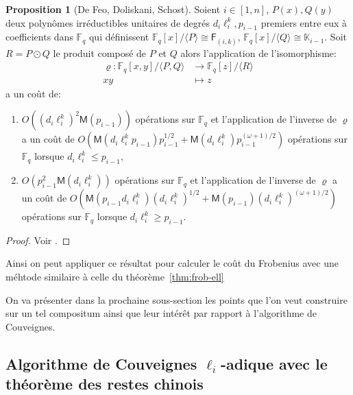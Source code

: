 \documentclass[10pt,a4paper]{book}
\theoremstyle{plain}
\theoremstyle{definition}
\theoremstyle{definition}
\theoremstyle{definition}
\newtheorem{prop}[thm]{Proposition}
\theoremstyle{definition}
\theoremstyle{remark}
\theoremstyle{remark}
\theoremstyle{definition}
\begin{document}
\begin{prop}[De Feo, Doliskani, Schost]
\label{pro:iso:fie}
Soient $i \in [1,n]$, $P(x),Q(y)$ deux polynômes irréductibles unitaires de degrés 
$d_i\ell_i^{k},p_{i-1}$ premiers entre eux à coefficients dans $\mathbb{F}_q$
qui définissent $\mathbb{F}_q[x]/\langle P \rangle \cong \mathsf{F}_{(i,k)}$,
$\mathbb{F}_q[x]/\langle Q \rangle \cong \mathbb{K}_{i-1}$. Soit $R=P \odot 
Q$ le produit composé de $P$ et $Q$ alors l'application de l'isomorphisme:
\begin{equation*}
\begin{alignedat}{1}
\varrho : \mathbb{F}_q[x,y]/\langle P, Q \rangle & \rightarrow \mathbb{F}_q[z]/\langle R \rangle \\
xy & \mapsto z
\end{alignedat}
\end{equation*}
a un coût de:
\begin{enumerate}
\item $O((d_i\ell_i^{k})^2\mathsf{M}(p_{i-1}))$ opérations sur $\mathbb{F}_q$
 et l'application de l'inverse de $\varrho$ a un coût de 
 $O(\mathsf{M}(d_i\ell_i^{k}p_{i-1})p_{i-1}^{1/2}+\mathsf{M}(d_i\ell_i^{k})p_{i-1}^{(\omega+1)/2})$ 
opérations sur $\mathbb{F}_q$ lorsque 
$d_i\ell_i^{k} \leqslant p_{i-1}$,
\item $O(p_{i-1}^2\mathsf{M}(d_i\ell_i^{k}))$ opérations sur $\mathbb{F}_q$ 
et l'application de l'inverse de $\varrho$ a un coût de 
$O(\mathsf{M}(p_{i-1}d_i\ell_i^{k})(d_i\ell_i^{k})^{1/2}+\mathsf{M}(p_{i-1})(d_i\ell_i^{k})^{(\omega+1)/2})$ 
opérations sur $\mathbb{F}_q$ lorsque $d_i\ell_i^{k} \geqslant p_{i-1}$.
\end{enumerate}
\end{prop}

\begin{proof}
Voir \cite{DeFeoDoliskaniSchost14}.
\end{proof}

Ainsi on peut appliquer ce résultat pour calculer le coût du Frobenius avec 
une méhtode similaire à celle du théorème~\ref{thm:frob-ell}

On va présenter dans la prochaine sous-section les points que l'on veut 
construire sur un tel compositum ainsi que leur intérêt par rapport à 
l'algorithme de Couveignes.

\subsection{Algorithme de Couveignes $\ell_i$-adique avec le théorème des restes chinois}
\end{document}
